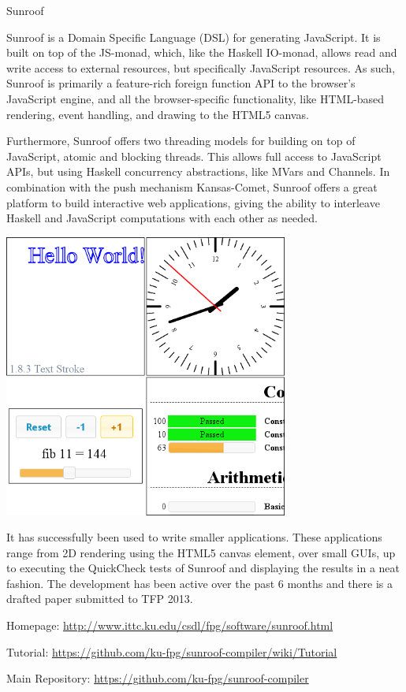 \begin{hcarentry}[new]{Sunroof}
\label{sunroof}
\makeheader

Sunroof is a Domain Specific Language (DSL) for generating JavaScript.
It is built on top of the JS-monad, which, like the Haskell IO-monad, allows 
read and write access to external resources, but specifically JavaScript
resources. As such, Sunroof is primarily a feature-rich foreign
function API to the browser's JavaScript engine, and all the browser-specific
functionality, like HTML-based rendering, event handling, and 
drawing to the HTML5 canvas. 

Furthermore, Sunroof offers two threading models for 
building on top of JavaScript, atomic and blocking threads.
This allows full access to JavaScript APIs, but
using Haskell concurrency abstractions, like MVars and Channels.
In combination with the push mechanism Kansas-Comet,
Sunroof offers a great platform to build interactive web applications,
giving the ability to interleave Haskell and JavaScript computations
with each other as needed.

\begin{center}
\includegraphics[width=0.7\textwidth]{html/Sunroof-Examples.png}
\end{center}

It has successfully been used to write smaller applications. These
applications range from 2D rendering using the HTML5 canvas element,
over small GUIs, up to executing the QuickCheck tests of Sunroof 
and displaying the results in a neat fashion.
%
The development has been active over the past 6 months and there is
a drafted paper submitted to TFP 2013.

\FurtherReading
\begin{compactitem}
\item Homepage: \url{http://www.ittc.ku.edu/csdl/fpg/software/sunroof.html}
\item Tutorial: \url{https://github.com/ku-fpg/sunroof-compiler/wiki/Tutorial}
\item Main Repository: \url{https://github.com/ku-fpg/sunroof-compiler}
\end{compactitem}
\end{hcarentry}
